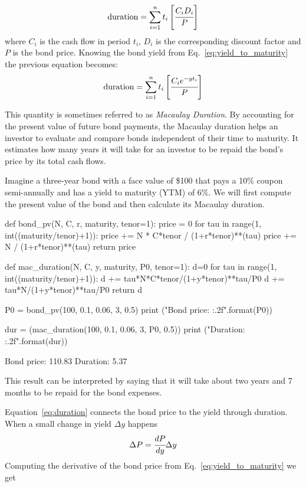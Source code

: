 \begin{equation}
\textrm{duration} = \sum_{i=1}^{n} t_i \left[\cfrac{C_i D_i}{P}\right] 
\end{equation}
where $C_i$ is the cash flow in period $t_i$, $D_i$ is the corresponding discount factor and $P$ is the bond price.
Knowing the bond yield from Eq.~\ref{eq:yield_to_maturity} the previous equation becomes:
\begin{equation}
\textrm{duration} = \sum_{i=1}^{n} t_i \left[\cfrac{C_i e^{-yt_i}}{P}\right] 
\label{eq:duration}
\end{equation}

This quantity is sometimes referred to as \emph{Macaulay Duration}. By accounting for the present value of future bond payments, the Macaulay duration helps an investor to evaluate and compare bonds independent of their time to maturity.
It estimates how many years it will take for an investor to be repaid the bond’s price by its total cash flows.

Imagine a three-year bond with a face value of \$100 that pays a 10\% coupon semi-annually and has a yield to maturity (YTM) of 6\%. We will first compute the present value of the bond and then calculate its Macaulay duration.

\begin{ipython}
def bond_pv(N, C, r, maturity, tenor=1):
	price = 0
	for tau in range(1, int((maturity/tenor)+1)):
		price += N * C*tenor / (1+r*tenor)**(tau)
	price += N / (1+r*tenor)**(tau)
	return price

def mac_duration(N, C, y, maturity, P0, tenor=1): 
	d=0
	for tau in range(1, int((maturity/tenor)+1)):
		d += tau*N*C*tenor/(1+y*tenor)**tau/P0
	d += tau*N/(1+y*tenor)**tau/P0 
	return d

P0 = bond_pv(100, 0.1, 0.06, 3, 0.5)
print ("Bond price: {:.2f}".format(P0))

dur = (mac_duration(100, 0.1, 0.06, 3, P0, 0.5))
print ("Duration: {:.2f}".format(dur))
\end{ipython}
\begin{ioutput}
Bond price: 110.83
Duration: 5.37
\end{ioutput}

This result can be interpreted by saying that it will take about two years and 7 months to be repaid for the bond expenses.

Equation~\ref{eq:duration} connects the bond price to the yield through duration. When a small change in yield $\Delta y$ happens
\begin{equation}
\Delta P = \cfrac{dP}{dy}\Delta y
\label{eq:price_1st_order}
\end{equation}
\noindent
Computing the derivative of the bond price from Eq.~\ref{eq:yield_to_maturity} we get

